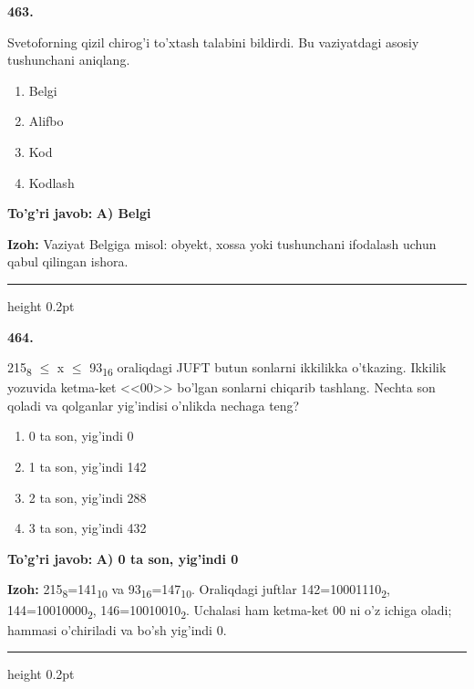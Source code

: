 \documentclass[10pt,a4paper,oneside]{article}
\begin{document}
\noindent\textbf{\color{ink}463.}
\par
Svetoforning qizil chirog'i to'xtash talabini bildirdi. Bu vaziyatdagi asosiy tushunchani aniqlang.
\begin{enumerate}[label=\Alph*),leftmargin=9mm]
\item Belgi
\item Alifbo
\item Kod
\item Kodlash
\end{enumerate}
\begin{tcolorbox}[enhanced,breakable,colback=teal!4,colframe=teal!50!black,boxrule=0.5pt,arc=1.1mm,left=3mm,right=3mm,top=1.7mm,bottom=1.7mm,before skip=2mm,after skip=2mm]
\textbf{\color{teal}To'g'ri javob:} \textbf{A) Belgi}
\par\smallskip
\textbf{Izoh:} Vaziyat Belgiga misol: obyekt, xossa yoki tushunchani ifodalash uchun qabul qilingan ishora.
\end{tcolorbox}
\vspace{2mm}\hrule height 0.2pt \vspace{3mm}

\noindent\textbf{\color{ink}464.}
\par
215\textsubscript{8} \ensuremath{\leq} x \ensuremath{\leq} 93\textsubscript{1}\textsubscript{6} oraliqdagi JUFT butun sonlarni ikkilikka o'tkazing. Ikkilik yozuvida ketma-ket <<00>> bo'lgan sonlarni chiqarib tashlang. Nechta son qoladi va qolganlar yig'indisi o'nlikda nechaga teng?
\begin{enumerate}[label=\Alph*),leftmargin=9mm]
\item 0 ta son, yig'indi 0
\item 1 ta son, yig'indi 142
\item 2 ta son, yig'indi 288
\item 3 ta son, yig'indi 432
\end{enumerate}
\begin{tcolorbox}[enhanced,breakable,colback=teal!4,colframe=teal!50!black,boxrule=0.5pt,arc=1.1mm,left=3mm,right=3mm,top=1.7mm,bottom=1.7mm,before skip=2mm,after skip=2mm]
\textbf{\color{teal}To'g'ri javob:} \textbf{A) 0 ta son, yig'indi 0}
\par\smallskip
\textbf{Izoh:} 215\textsubscript{8}=141\textsubscript{1}\textsubscript{0} va 93\textsubscript{1}\textsubscript{6}=147\textsubscript{1}\textsubscript{0}. Oraliqdagi juftlar 142=10001110\textsubscript{2}, 144=10010000\textsubscript{2}, 146=10010010\textsubscript{2}. Uchalasi ham ketma-ket 00 ni o'z ichiga oladi; hammasi o'chiriladi va bo'sh yig'indi 0.
\end{tcolorbox}
\vspace{2mm}\hrule height 0.2pt \vspace{3mm}
\end{document}
